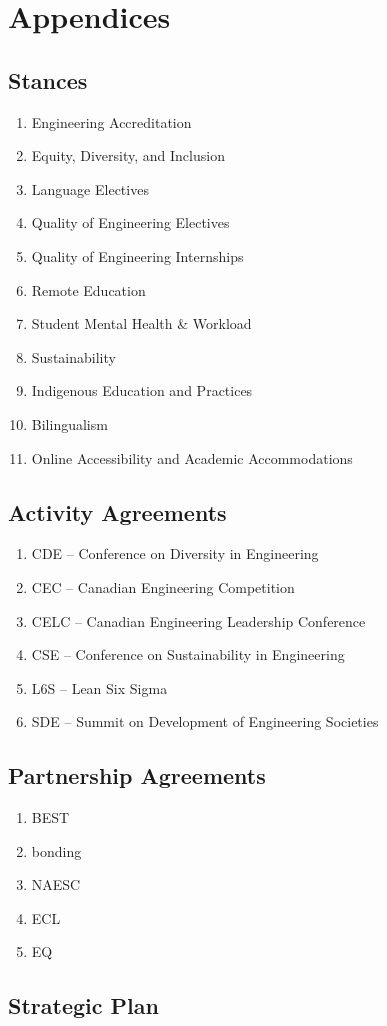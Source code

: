 \section{Appendices}
\label{appendices}

\subsection{Stances}
\label{stances}

\begin{enumerate}
 \item
  Engineering Accreditation
 \item
  Equity, Diversity, and Inclusion
 \item
  Language Electives
 \item
  Quality of Engineering Electives
 \item
  Quality of Engineering Internships
 \item
  Remote Education
 \item
  Student Mental Health \& Workload
 \item
  Sustainability
 \item
  Indigenous Education and Practices
 \item
  Bilingualism
 \item
  Online Accessibility and Academic Accommodations
\end{enumerate}

\subsection{Activity Agreements}
\label{activity-agreements-1}

\begin{enumerate}
 \item
  CDE – Conference on Diversity in Engineering
 \item
  CEC – Canadian Engineering Competition
 \item
  CELC – Canadian Engineering Leadership Conference
 \item
  CSE – Conference on Sustainability in Engineering
 \item
  L6S – Lean Six Sigma
 \item
  SDE – Summit on Development of Engineering Societies
\end{enumerate}

\subsection{Partnership Agreements}
\label{partnership-agreements}

\begin{enumerate}
 \item
  BEST
 \item
  bonding
 \item
  NAESC
 \item
  ECL
 \item
  EQ
\end{enumerate}

\subsection{Strategic Plan}
\label{strategic-plan}
